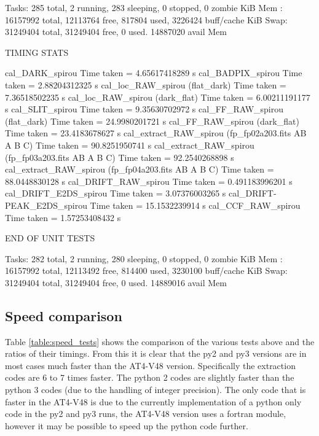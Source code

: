 \begin{cmdboxprint}
Tasks: 285 total,   2 running, 283 sleeping,   0 stopped,   0 zombie
KiB Mem : 16157992 total, 12113764 free,   817804 used,  3226424 buff/cache
KiB Swap: 31249404 total, 31249404 free,        0 used. 14887020 avail Mem

TIMING STATS

cal_DARK_spirou Time taken = 4.65617418289 s
cal_BADPIX_spirou Time taken = 2.88204312325 s
cal_loc_RAW_spirou (flat_dark) Time taken = 7.36518502235 s
cal_loc_RAW_spirou (dark_flat) Time taken = 6.00211191177 s
cal_SLIT_spirou Time taken = 9.35630702972 s
cal_FF_RAW_spirou (flat_dark) Time taken = 24.9980201721 s
cal_FF_RAW_spirou (dark_flat) Time taken = 23.4183678627 s
cal_extract_RAW_spirou (fp_fp02a203.fits AB A B C) Time taken = 90.8251950741 s
cal_extract_RAW_spirou (fp_fp03a203.fits AB A B C) Time taken = 92.2540268898 s
cal_extract_RAW_spirou (fp_fp04a203.fits AB A B C) Time taken = 88.0448830128 s
cal_DRIFT_RAW_spirou Time taken = 0.491183996201 s
cal_DRIFT_E2DS_spirou Time taken = 3.07376003265 s
cal_DRIFT-PEAK_E2DS_spirou Time taken = 15.1532239914 s
cal_CCF_RAW_spirou Time taken = 1.57253408432 s

END OF UNIT TESTS

Tasks: 282 total,   2 running, 280 sleeping,   0 stopped,   0 zombie
KiB Mem : 16157992 total, 12113492 free,   814400 used,  3230100 buff/cache
KiB Swap: 31249404 total, 31249404 free,        0 used. 14889016 avail Mem
\end{cmdboxprint}

\newpage

\subsection{Speed comparison}

Table \ref{table:speed_tests} shows the comparison of the various tests above and the ratios of their timings. From this it is clear that the py2 and py3 versions are in most cases much faster than the AT4-V48 version. Specifically the extraction codes are 6 to 7 times faster. The python 2 codes are slightly faster than the python 3 codes (due to the handling of integer precision). The only code that is faster in the AT4-V48 is \calCCF due to the currently implementation of a python only code in the py2 and py3 runs, the AT4-V48 version uses a fortran module, however it may be possible to speed up the python code further.

